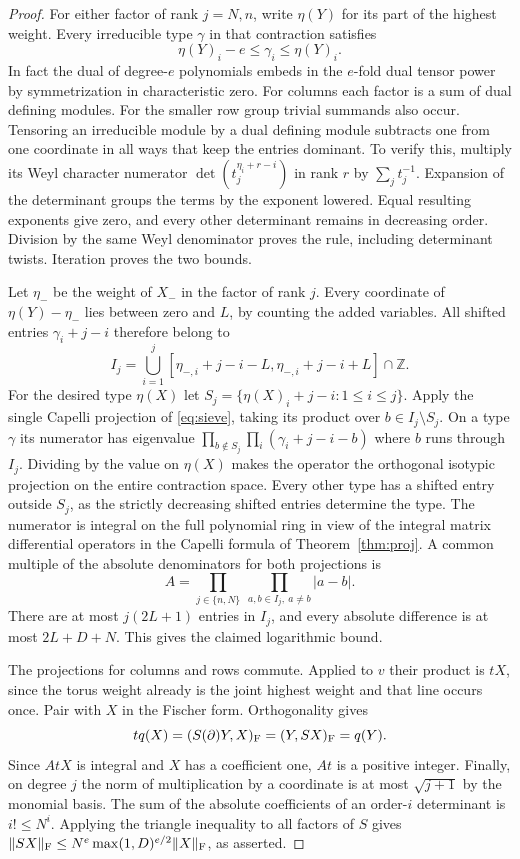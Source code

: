 \documentclass[a4paper,11pt]{article}
\theoremstyle{definition}
\theoremstyle{remark}
\numberwithin{equation}{section}
\begin{document}
\begin{proof}
For either factor of rank \(j=N,n\), write \(\eta(Y)\) for its
part of the highest weight. Every irreducible type \(\gamma\)
in that contraction satisfies
\[
                  \eta(Y)_i-e\le\gamma_i\le\eta(Y)_i .
\]
In fact the dual of degree-\(e\) polynomials embeds in the
\(e\)-fold dual tensor power by symmetrization in characteristic
zero. For columns each factor is a sum of dual defining modules.
For the smaller row group trivial summands also occur. Tensoring
an irreducible module by a dual defining module subtracts one
from one coordinate in all ways that keep the entries dominant.
To verify this, multiply its Weyl character numerator
\(\det(t_j^{\eta_i+r-i})\) in rank \(r\) by \(\sum_jt_j^{-1}\).
Expansion of the determinant groups the terms by the exponent
lowered. Equal resulting exponents give zero, and every other
determinant remains in decreasing order. Division by the same
Weyl denominator proves the rule, including determinant twists.
Iteration proves the two bounds.

Let \(\eta_-\) be the weight of \(X_-\) in the factor of rank
\(j\). Every coordinate of \(\eta(Y)-\eta_-\) lies between zero
and \(L\), by counting the added variables. All shifted entries
\(\gamma_i+j-i\) therefore belong to
\[
 I_j=\bigcup_{i=1}^j
 [\eta_{-,i}+j-i-L,\eta_{-,i}+j-i+L]\cap\mathbb Z .
\]
For the desired type \(\eta(X)\) let
\(S_j=\{\eta(X)_i+j-i:1\le i\le j\}\). Apply the single
Capelli projection of \eqref{eq:sieve}, taking its product over
\(b\in I_j\setminus S_j\). On a type \(\gamma\) its numerator
has eigenvalue \(\prod_{b\notin S_j}\prod_i(\gamma_i+j-i-b)\)
where \(b\) runs through \(I_j\). Dividing by the value on
\(\eta(X)\) makes the operator the orthogonal isotypic
projection on the entire contraction space. Every other type
has a shifted entry outside \(S_j\), as the strictly decreasing
shifted entries determine the type. The numerator is integral on
the full polynomial ring in view of the integral matrix
differential operators in the Capelli formula of
Theorem~\ref{thm:proj}. A common multiple of the absolute
denominators for both projections is
\[
             A=\prod_{j\in\{n,N\}}\ 
                \prod_{a,b\in I_j,\ a\ne b}|a-b| .
\]
There are at most \(j(2L+1)\) entries in \(I_j\), and every
absolute difference is at most \(2L+D+N\). This gives the
claimed logarithmic bound.

The projections for columns and rows commute. Applied to \(v\)
their product is \(tX\), since the torus weight already is the
joint highest weight and that line occurs once. Pair with \(X\)
in the Fischer form. Orthogonality gives
\[
           t q(X)=(S(\partial)Y,X)_{\rm F}
                         =(Y,SX)_{\rm F}=q(Y).
\]
Since \(AtX\) is integral and \(X\) has a coefficient one,
\(At\) is a positive integer. Finally, on degree \(j\) the norm
of multiplication by a coordinate is at most \(\sqrt{j+1}\)
by the monomial basis. The sum of the absolute coefficients of
an order-\(i\) determinant is \(i!\le N^i\). Applying the
triangle inequality to all factors of \(S\) gives
\(\|SX\|_{\rm F}\le N^e\max(1,D)^{e/2}\|X\|_{\rm F}\),
as asserted.
\end{proof}
\end{document}
